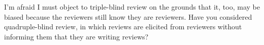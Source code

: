 \documentclass[12pt]{sigbovik-review}
\author{Michael Coblenz}
\begin{document}
\maketitle

I’m afraid I must object to triple-blind review on the grounds that it, too, may be biased because the
reviewers still know they are reviewers. Have you considered quadruple-blind review, in which reviews are
elicited from reviewers without informing them that they are writing reviews?
\end{document}
